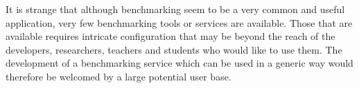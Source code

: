 It is strange that although benchmarking seem to be a very common and useful application, very few benchmarking tools or services are available. Those that are available requires intricate configuration that may be beyond the reach of the developers, researchers,
teachers and students who would like to use them. The development of a benchmarking service which can be used in a generic way would therefore be welcomed by a large
potential user base.
